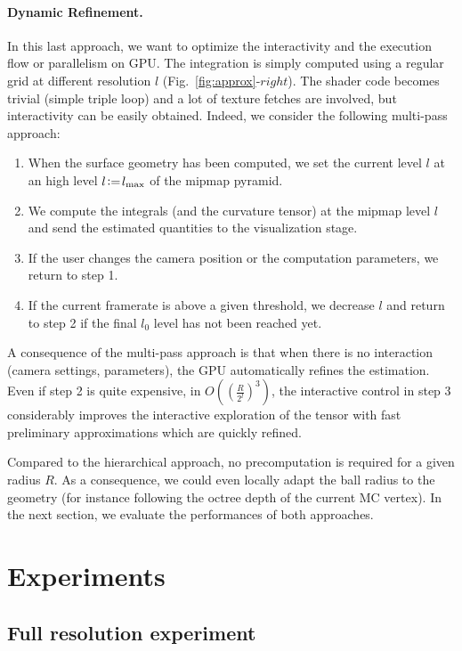 \documentclass{llncs}
\begin{document}
\paragraph{Dynamic Refinement.} In this last approach, we want to optimize
the interactivity and the execution flow or parallelism on GPU\@. The
integration is simply computed using a regular grid at different
resolution $l$ (Fig.~\ref{fig:approx}-$right$). The shader code
becomes trivial (simple triple loop) and a lot of texture fetches are
involved, but interactivity can be easily obtained. Indeed, we
consider the following multi-pass approach:
\begin{enumerate}
\item When the surface geometry has been computed, we set the current
  level $l$ at an high level $l\!\mathrel{\mathop:}=\! l_{\max}$ of the mipmap
  pyramid.
\item We compute the integrals (and the curvature tensor) at the
  mipmap level $l$ and  send the estimated quantities to the
  visualization stage.
\item If the user changes the camera position or the computation
  parameters, we return to step 1.
\item If the current framerate is above a given threshold, we decrease
  $l$ and return to step 2 if the final $l_0$ level has not been
  reached yet.
\end{enumerate}
A consequence of the multi-pass approach is that when there is no
interaction (camera settings, parameters), the GPU automatically
refines the estimation. Even if step 2 is quite expensive, in
$O\left({\left({\frac{R}{2^l}}\right)}^3\right)$, the interactive control
in step 3 considerably improves the interactive exploration of the
tensor with fast preliminary approximations which are quickly refined.

Compared to the hierarchical approach, no precomputation is required
for a given radius $R$. As a consequence, we could even locally adapt
the ball radius to the geometry (for instance following the octree
depth of the current MC vertex). In the next section, we evaluate the
performances of both approaches.

\section{Experiments}
\label{sec:experiments}

\subsection{Full resolution experiment}
\end{document}
